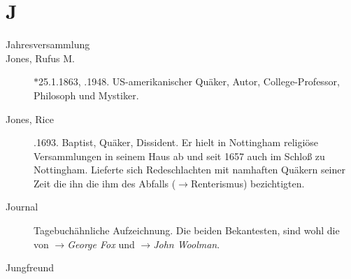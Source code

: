 \section*{J}

\articlesize

\begin{description}
 \item[Jahresversammlung]

 \item[Jones, Rufus M.] $\ast$25.1.1863, .1948. US-amerikanischer Quäker, Autor, College-Professor, Philosoph und Mystiker.

 \item[Jones, Rice] .1693. Baptist, Quäker, Dissident. Er hielt in Nottingham religiöse Versammlungen in seinem Haus ab und seit 1657 auch im Schloß zu Nottingham. Lieferte sich Redeschlachten mit namhaften Quäkern seiner Zeit die ihn die ihm des Abfalls ($\to$Renterismus) bezichtigten.

 \item[Journal] Tagebuchähnliche Aufzeichnung. Die beiden Bekantesten, sind wohl die von $\to$\textit{George Fox} und $\to$\textit{John Woolman}.

 \item[Jungfreund]
 \end{description}

\normalsize